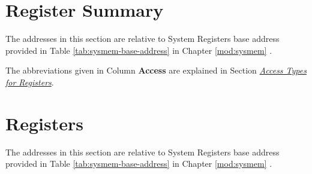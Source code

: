 \documentclass[main\_\_EN.tex]{subfiles}
\begin{document}

\clearpage
\begin{landscape}
\hypertarget{sysreg-reg-summ}{}
\section{Register Summary}
\label{sec:sysreg-reg-summ}

The addresses in this section are relative to System Registers base address provided in Table \ref{tab:sysmem-base-address} in Chapter \ref{mod:sysmem} \textit{}.

The abbreviations given in Column \textbf{Access} are explained in Section \hyperref[glossary-access-types]{\textit{Access Types for Registers}}.


\end{landscape}



\clearpage
\section{Registers}

The addresses in this section are relative to System Registers base address provided in Table \ref{tab:sysmem-base-address} in Chapter \ref{mod:sysmem} \textit{}.


\end{document}
